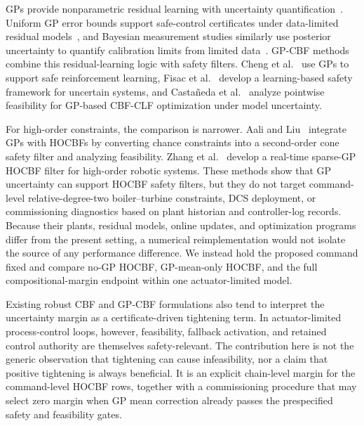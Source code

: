 GPs provide nonparametric residual learning with uncertainty quantification~\cite{rasmussen2006gp,srinivas2010gp}. Uniform GP error bounds support safe-control certificates under data-limited residual models~\cite{lederer2021uniform}, and Bayesian measurement studies similarly use posterior uncertainty to quantify calibration limits from limited data~\cite{alburayt2026bayesian}. GP-CBF methods combine this residual-learning logic with safety filters. Cheng et al.~\cite{cheng2019guaranteed} use GPs to support safe reinforcement learning, Fisac et al.~\cite{fisac2018general} develop a learning-based safety framework for uncertain systems, and Casta{\~n}eda et al.~\cite{castaneda2021pointwise} analyze pointwise feasibility for GP-based CBF-CLF optimization under model uncertainty.

For high-order constraints, the comparison is narrower. Aali and Liu~\cite{aali2024learning} integrate GPs with HOCBFs by converting chance constraints into a second-order cone safety filter and analyzing feasibility. Zhang et al.~\cite{zhang2025adaptive} develop a real-time sparse-GP HOCBF filter for high-order robotic systems. These methods show that GP uncertainty can support HOCBF safety filters, but they do not target command-level relative-degree-two boiler--turbine constraints, DCS deployment, or commissioning diagnostics based on plant historian and controller-log records. Because their plants, residual models, online updates, and optimization programs differ from the present setting, a numerical reimplementation would not isolate the source of any performance difference. We instead hold the proposed command fixed and compare no-GP HOCBF, GP-mean-only HOCBF, and the full compositional-margin endpoint within one actuator-limited model.

Existing robust CBF and GP-CBF formulations also tend to interpret the uncertainty margin as a certificate-driven tightening term. In actuator-limited process-control loops, however, feasibility, fallback activation, and retained control authority are themselves safety-relevant. The contribution here is not the generic observation that tightening can cause infeasibility, nor a claim that positive tightening is always beneficial. It is an explicit chain-level margin for the command-level HOCBF rows, together with a commissioning procedure that may select zero margin when GP mean correction already passes the prespecified safety and feasibility gates.
